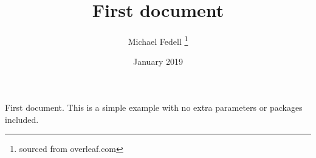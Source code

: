 \documentclass[12pt, letterpaper]{article}
\title{First document}
\author{Michael Fedell \thanks{sourced from overleaf.com}}
\date{January 2019}
\begin{document}
\maketitle
First document. This is a simple example with no
extra parameters or packages included.
\end{document}

